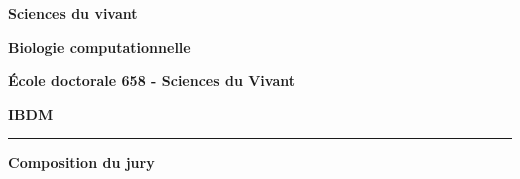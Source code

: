 \vspace{4em}

\begin{center}
	\begin{minipage}[t]{.45\linewidth}
    	    \vspace{.5em}
        	\textsf{\textbf{Sciences du vivant}}
        	
        	
    	    \vspace{1em}
        	\textsf{\textbf{Biologie computationnelle}}
        	
        	
    	    \vspace{2em}
        	\textsf{\textbf{École doctorale 658 - Sciences du Vivant}}
        	
        	
    	    \vspace{1em}
        	\textsf{\textbf{IBDM}}
        	

	\end{minipage}\hfill
	\begin{minipage}[t]{.03\linewidth}
	    \rule[-280pt]{1pt}{280pt}
	\end{minipage}\hfill
	\begin{minipage}[t]{.52\linewidth}
	    \vspace{.5em}
    	\textsf{\textbf{Composition du jury}}


\end{minipage}
\end{center}
